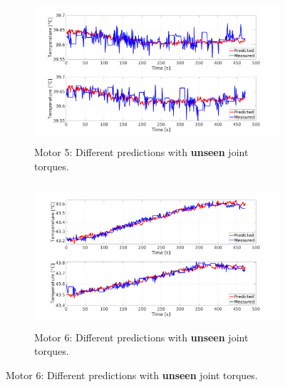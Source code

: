 \documentclass{ifacconf}
\begin{document}
\begin{figure}[t!]
	\begin{subfigure}[t]{0.5\textwidth}
		\centering
		\includegraphics[height=2.1in, width=\linewidth, keepaspectratio]{./pictures/applications/feedback/table/j5.png}
		\caption{Motor 5: Different predictions with \textbf{unseen} joint torques.}
	\end{subfigure}%
	\begin{subfigure}[t]{0.5\textwidth}
		\centering
		\includegraphics[height=2.1in, width=\linewidth, keepaspectratio]{./pictures/applications/feedback/table/j6.png}
		\caption{Motor 6: Different predictions with \textbf{unseen} joint torques.}
	\end{subfigure}

    \vspace{1ex} 


\end{figure}
\end{document}
